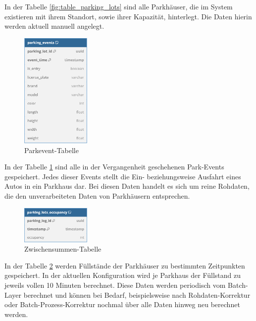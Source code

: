 In der Tabelle \ref{fig:table_parking_lots} sind alle Parkhäuser, die im System existieren mit ihrem Standort, sowie ihrer Kapazität, hinterlegt.
Die Daten hierin werden aktuell manuell angelegt.

\begin{figure}[h!]%
    \centering%
    \includegraphics[width=0.3\textwidth]{Graphics/parking_events.png}%
    \caption{Parkevent-Tabelle}%
    \label{fig:table_parking_events}
\end{figure}%

In der Tabelle \ref{fig:table_parking_events} sind alle in der Vergangenheit geschehenen Park-Events gespeichert.
Jedes dieser Events stellt die Ein- beziehungsweise Ausfahrt eines Autos in ein Parkhaus dar.
Bei diesen Daten handelt es sich um reine Rohdaten, die den unverarbeiteten Daten von Parkhäusern entsprechen.

\begin{figure}[h!]%
    \centering%
    \includegraphics[width=0.3\textwidth]{Graphics/occupancy.png}%
    \caption{Zwischensummen-Tabelle}%
    \label{fig:table_occupancy}
\end{figure}%

In der Tabelle \ref{fig:table_occupancy} werden Füllstände der Parkhäuser zu bestimmten Zeitpunkten gespeichert.
In der aktuellen Konfiguration wird je Parkhaus der Füllstand zu jeweils vollen 10 Minuten berechnet.
Diese Daten werden periodisch vom Batch-Layer berechnet und können bei Bedarf, beispielsweise nach Rohdaten-Korrektur oder Batch-Prozess-Korrektur nochmal über alle Daten hinweg neu berechnet werden.

